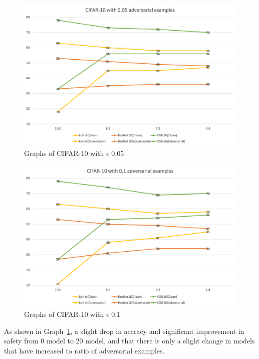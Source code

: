 \documentclass[journal,article,submit,moreauthors,pdftex]{Definitions/mdpi}
\begin{document}
\begin{figure}[H]
    \includegraphics[width=13 cm]{Definitions/graph-005cifar10.png}
    \caption{Graphs of CIFAR-10 with \begin{math}\epsilon\end{math} 0.05\label{graph1}}
\end{figure} 

\begin{figure}[H]
    \includegraphics[width=13 cm]{Definitions/graph-01cifar10.png}
    \caption{Graphs of CIFAR-10 with \begin{math}\epsilon\end{math} 0.1\label{graph2}}
\end{figure} 

As shown in Graph~\ref{graph1}, a slight drop in accracy and significant improvement in safety from 0 model to 20 model, and that there is only a slight change in models that have increased to ratio of adversarial examples.
\end{document}
